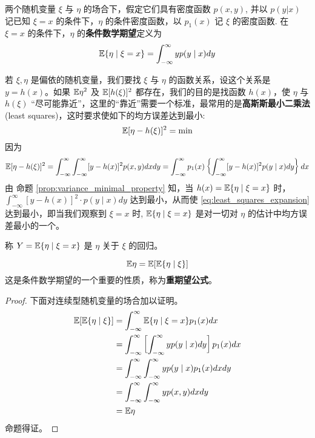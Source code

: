 \begin{definition}[条件数学期望] \label{def:conditional_expectation}
两个随机变量 $\xi$ 与 $\eta$ 的场合下，假定它们具有密度函数 $p(x,y)$, 并以 $p(y|x)$ 记已知 $\xi=x$ 的条件下，$\eta$ 的条件密度函数，以 $p_1(x)$ 记 $\xi$ 的密度函数. 在 $\xi=x$ 的条件下，$\eta$ 的\textbf{条件数学期望}定义为
\begin{equation} \label{eq:conditional_expectation}
\mathbb{E}\{\eta \mid \xi = x\} = \int_{-\infty}^\infty y p(y \mid x) dy
\end{equation}
\end{definition}

若 $\xi,\eta$ 是偏依的随机变量，我们要找 $\xi$ 与 $\eta$ 的函数关系，设这个关系是 $y=h(x)$。如果 $\mathbb{E}\eta^2$ 及 $\mathbb{E}[h(\xi)]^2$ 都存在，我们的目的是找函数 $h(x)$，使 $\eta$ 与 $h(\xi)$ “尽可能靠近”，这里的“靠近”需要一个标准，最常用的是\textbf{高斯斯最小二乘法} (least squares)，这时要求使如下的均方误差达到最小:
\begin{equation} \label{eq:least_squares_min}
\mathbb{E}[\eta - h(\xi)]^2 = \min
\end{equation}
因为
\begin{equation} \label{eq:least_squares_expansion}
\mathbb{E}[\eta - h(\xi)]^2 = \int_{-\infty}^\infty \int_{-\infty}^\infty [y - h(x)]^2 p(x,y)dxdy = \int_{-\infty}^\infty p_1(x)\left\{\int_{-\infty}^\infty [y - h(x)]^2 p(y \mid x) dy\right\} dx
\end{equation}
由 命题 \ref{prop:variance_minimal_property} 知，当 $h(x)=\mathbb{E}\{\eta \mid \xi=x\}$ 时，$\int_{-\infty}^\infty [y-h(x)]^2 \cdot p(y \mid x)dy$ 达到最小，从而使 \eqref{eq:least_squares_expansion} 达到最小，即当我们观察到 $\xi=x$ 时, $\mathbb{E}\{\eta \mid \xi=x\}$ 是对一切对 $\eta$ 的估计中均方误差最小的一个。

\begin{definition}[回归]\label{def:回归}
    称 $Y=\mathbb{E}\{\eta \mid \xi=x\}$ 是 $\eta$ 关于 $\xi$ 的回归。
\end{definition}
\begin{proposition} \label{prop:law_of_total_expectation}
\begin{equation} \label{eq:law_of_total_expectation_formula}
\mathbb{E}\eta = \mathbb{E}[\mathbb{E}\{\eta \mid \xi\}]
\end{equation}
这是条件数学期望的一个重要的性质，称为\textbf{重期望公式}。
\end{proposition}

\begin{proof}
下面对连续型随机变量的场合加以证明。
\begin{align*}
\mathbb{E}[\mathbb{E}\{\eta \mid \xi\}] &= \int_{-\infty}^\infty \mathbb{E}\{\eta \mid \xi=x\}p_1(x) dx \\
&= \int_{-\infty}^\infty \left[ \int_{-\infty}^\infty yp(y \mid x) dy \right] p_1(x) dx \\
&= \int_{-\infty}^\infty \int_{-\infty}^\infty yp(y \mid x)p_1(x) dx dy \\
&= \int_{-\infty}^\infty \int_{-\infty}^\infty yp(x,y) dx dy \\
&= \mathbb{E}\eta
\end{align*}
命题得证。
\end{proof}
